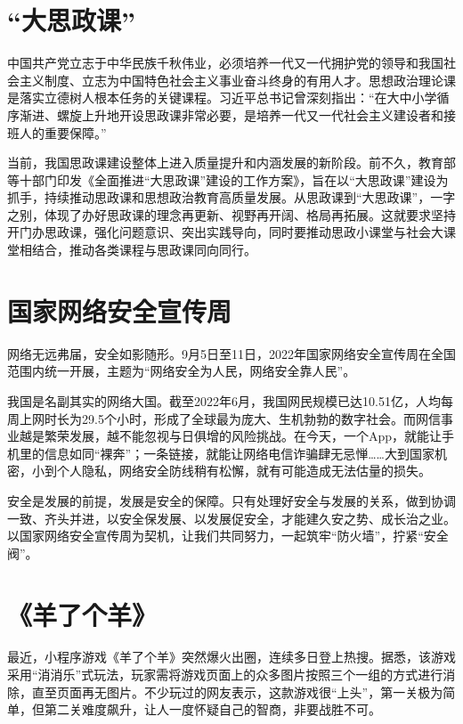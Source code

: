 
\section*{“大思政课”}

中国共产党立志于中华民族千秋伟业，必须培养一代又一代拥护党的领导和我国社会主义制度、立志为中国特色社会主义事业奋斗终身的有用人才。思想政治理论课是落实立德树人根本任务的关键课程。习近平总书记曾深刻指出：“在大中小学循序渐进、螺旋上升地开设思政课非常必要，是培养一代又一代社会主义建设者和接班人的重要保障。”

当前，我国思政课建设整体上进入质量提升和内涵发展的新阶段。前不久，教育部等十部门印发《全面推进“大思政课”建设的工作方案》，旨在以“大思政课”建设为抓手，持续推动思政课和思想政治教育高质量发展。从思政课到“大思政课”，一字之别，体现了办好思政课的理念再更新、视野再开阔、格局再拓展。这就要求坚持开门办思政课，强化问题意识、突出实践导向，同时要推动思政小课堂与社会大课堂相结合，推动各类课程与思政课同向同行。

\section*{国家网络安全宣传周}

网络无远弗届，安全如影随形。9月5日至11日，2022年国家网络安全宣传周在全国范围内统一开展，主题为“网络安全为人民，网络安全靠人民”。

我国是名副其实的网络大国。截至2022年6月，我国网民规模已达10.51亿，人均每周上网时长为29.5个小时，形成了全球最为庞大、生机勃勃的数字社会。而网信事业越是繁荣发展，越不能忽视与日俱增的风险挑战。在今天，一个App，就能让手机里的信息如同“裸奔”；一条链接，就能让网络电信诈骗肆无忌惮……大到国家机密，小到个人隐私，网络安全防线稍有松懈，就有可能造成无法估量的损失。

安全是发展的前提，发展是安全的保障。只有处理好安全与发展的关系，做到协调一致、齐头并进，以安全保发展、以发展促安全，才能建久安之势、成长治之业。以国家网络安全宣传周为契机，让我们共同努力，一起筑牢“防火墙”，拧紧“安全阀”。

\clearpage
\section*{《羊了个羊》}

最近，小程序游戏《羊了个羊》突然爆火出圈，连续多日登上热搜。据悉，该游戏采用“消消乐”式玩法，玩家需将游戏页面上的众多图片按照三个一组的方式进行消除，直至页面再无图片。不少玩过的网友表示，这款游戏很“上头”，第一关极为简单，但第二关难度飙升，让人一度怀疑自己的智商，非要战胜不可。

